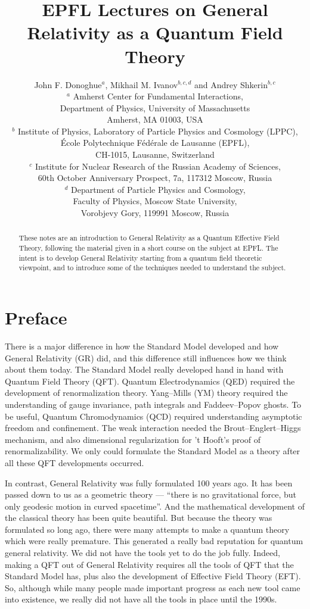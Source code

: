 \documentclass[12pt]{article}
\date{}
\title{{\bf EPFL Lectures on General Relativity as a Quantum Field Theory  }}
\author{{\normalsize John F. Donoghue$^{a}$,
Mikhail M. Ivanov$^{b,c,d}$
and Andrey Shkerin$^{b,c}$} \\
\normalsize $^a$ Amherst Center for Fundamental Interactions, \\
\normalsize Department of Physics,
\normalsize University of Massachusetts\\
\normalsize Amherst, MA  01003, USA \\
\normalsize $^b$ Institute of Physics, Laboratory of Particle Physics and Cosmology (LPPC), \\
\normalsize \'Ecole Polytechnique F\'ed\'erale de Lausanne (EPFL), \\
\normalsize CH-1015, Lausanne, Switzerland \\
\normalsize $^c$ Institute for Nuclear Research of the
\normalsize Russian Academy of Sciences,\\
\normalsize 60th October Anniversary Prospect, 7a, 117312
\normalsize Moscow, Russia  \\
\normalsize $^d$ Department of Particle Physics and Cosmology, \\
\normalsize Faculty of Physics, Moscow State University,\\
\normalsize Vorobjevy Gory, 119991 Moscow, Russia}
\begin{document}
\maketitle

\begin{abstract}
These notes are an introduction to General Relativity as a Quantum Effective Field Theory, following the material given in a short course on the subject at EPFL. The intent is to develop General Relativity starting from a quantum field theoretic viewpoint, and to introduce some of the techniques needed to understand the subject.
\end{abstract}

\newpage

\tableofcontents

\newpage

\section*{Preface}

There is a major difference in how the Standard Model developed and how General Relativity (GR) did, and this difference still influences how we think about them today.
The Standard Model really developed hand in hand with Quantum Field Theory (QFT). Quantum Electrodynamics (QED) required the development of renormalization theory. Yang--Mills (YM) theory required the understanding of gauge invariance, path integrals and Faddeev--Popov ghosts. To be useful, Quantum Chromodynamics (QCD) required understanding asymptotic freedom and confinement. The weak interaction needed the Brout--Englert--Higgs mechanism, and also dimensional regularization for 't Hooft's proof of renormalizability. We only could formulate the Standard Model as a theory after all these QFT developments occurred.

In contrast, General Relativity was fully formulated 100 years ago. It has been passed down to us as a geometric theory --- ``there is no gravitational force, but only geodesic motion in curved spacetime''. And the mathematical development of the classical theory has been quite beautiful. But because the theory was formulated so long ago, there were many attempts to make a quantum theory which were really premature. This generated a really bad reputation for quantum general relativity. We did not have the tools yet to do the job fully. Indeed, making a QFT out of General Relativity requires all the tools of QFT that the Standard Model has, plus also the development of Effective Field Theory (EFT). So, although while many people made important progress as each new tool came into existence, we really did not have all the tools in place until the 1990s.
\end{document}

